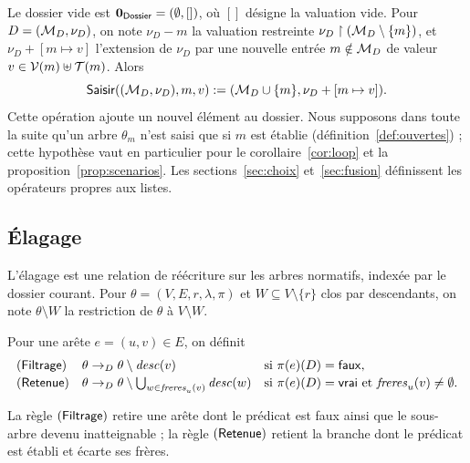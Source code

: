 \documentclass[review]{jflart}
\begin{document}
Le dossier vide est \(\mathbf{0}_{\mathsf{Dossier}}=(\emptyset,[])\), où \([]\) désigne la valuation
vide. Pour \(D=(\mathcal{M}_D,\nu_D)\), on note \(\nu_D-m\) la valuation restreinte
\(\nu_D\mathrel\upharpoonright(\mathcal{M}_D\setminus\{m\})\), et
\(\nu_D+[m\mapsto v]\) l'extension de \(\nu_D\) par une nouvelle entrée
\(m\notin\mathcal{M}_D\) de valeur \(v\in\mathcal{V}(m)\uplus\mathcal{T}(m)\). Alors
\begin{equation}
\mathsf{Saisir}((\mathcal{M}_D,\nu_D),m,v)
 :=(\mathcal{M}_D\cup\{m\},\nu_D+[m\mapsto v]).
\label{eq:input}
\end{equation}
Cette opération ajoute un nouvel élément au dossier. Nous supposons dans
toute la suite qu'un arbre \(\theta_m\) n'est saisi que si \(m\) est établie
(définition~\ref{def:ouvertes}) ; cette hypothèse vaut en particulier pour le
corollaire~\ref{cor:loop} et la proposition~\ref{prop:scenarios}. Les
sections~\ref{sec:choix} et~\ref{sec:fusion} définissent les opérateurs propres
aux listes.

\subsection{Élagage}

L'élagage est une relation de réécriture sur les arbres normatifs, indexée par
le dossier courant. Pour \(\theta=(V,E,r,\lambda,\pi)\) et
\(W\subseteq V\setminus\{r\}\) clos par descendants, on note
\(\theta\setminus W\) la restriction de \(\theta\) à \(V\setminus W\).

\begin{defi}[Réduction]\label{def:reduction}
Pour une arête \(e=(u,v)\in E\), on définit
\[
\begin{array}{lll}
 (\mathsf{Filtrage}) & \theta\to_{D}\theta\setminus\mathit{desc}(v)
   & \text{si }\pi(e)(D)=\mathsf{faux},\\[2pt]
 (\mathsf{Retenue}) & \theta\to_{D}\theta\setminus\bigcup_{w\in\mathit{freres}_u(v)}\mathit{desc}(w)
   & \text{si }\pi(e)(D)=\mathsf{vrai}\text{ et }\mathit{freres}_u(v)\neq\emptyset.
\end{array}
\]
\end{defi}

La règle \((\mathsf{Filtrage})\) retire une arête dont le prédicat est faux ainsi que le
sous-arbre devenu inatteignable ; la règle \((\mathsf{Retenue})\) retient la branche dont
le prédicat est établi et écarte ses frères.
\end{document}
